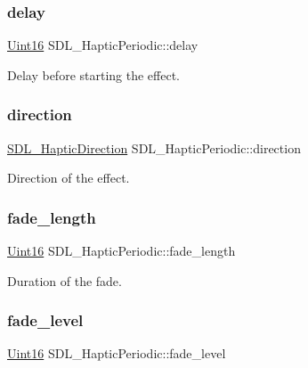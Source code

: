 \subsubsection{\texorpdfstring{delay}{delay}}
{\footnotesize\ttfamily \hyperlink{_s_d_l__stdinc_8h_a31fcc0a076c9068668173ee26d33e42b}{Uint16} S\+D\+L\+\_\+\+Haptic\+Periodic\+::delay}

Delay before starting the effect. \mbox{\label{struct_s_d_l___haptic_periodic_a2c4f27d4583187a7a994e79ad49083d3}} 
\subsubsection{\texorpdfstring{direction}{direction}}
{\footnotesize\ttfamily \hyperlink{struct_s_d_l___haptic_direction}{S\+D\+L\+\_\+\+Haptic\+Direction} S\+D\+L\+\_\+\+Haptic\+Periodic\+::direction}

Direction of the effect. \mbox{\label{struct_s_d_l___haptic_periodic_ae1c186d02304eae142a62dca72f50fa8}} 
\subsubsection{\texorpdfstring{fade\+\_\+length}{fade\_length}}
{\footnotesize\ttfamily \hyperlink{_s_d_l__stdinc_8h_a31fcc0a076c9068668173ee26d33e42b}{Uint16} S\+D\+L\+\_\+\+Haptic\+Periodic\+::fade\+\_\+length}

Duration of the fade. \mbox{\label{struct_s_d_l___haptic_periodic_afa7713fc264959873f2a852fca4174fd}} 
\subsubsection{\texorpdfstring{fade\+\_\+level}{fade\_level}}
{\footnotesize\ttfamily \hyperlink{_s_d_l__stdinc_8h_a31fcc0a076c9068668173ee26d33e42b}{Uint16} S\+D\+L\+\_\+\+Haptic\+Periodic\+::fade\+\_\+level}

